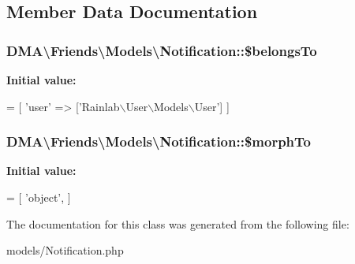 

\subsection{Member Data Documentation}
\hypertarget{classDMA_1_1Friends_1_1Models_1_1Notification_a7bd3ea8c8431f36da353372d8e42ae44}{
\subsubsection[{\$belongs\+To}]{\setlength{\rightskip}{0pt plus 5cm}D\+M\+A\textbackslash{}\+Friends\textbackslash{}\+Models\textbackslash{}\+Notification\+::\$belongs\+To}}\label{classDMA_1_1Friends_1_1Models_1_1Notification_a7bd3ea8c8431f36da353372d8e42ae44}
{\bfseries Initial value\+:}
\begin{DoxyCode}
= [
        \textcolor{stringliteral}{'user'} => [\textcolor{stringliteral}{'Rainlab\(\backslash\)User\(\backslash\)Models\(\backslash\)User'}]    
    ]
\end{DoxyCode}
\hypertarget{classDMA_1_1Friends_1_1Models_1_1Notification_ac726a50fd0378357be2f744f4c0bfb66}{
\subsubsection[{\$morph\+To}]{\setlength{\rightskip}{0pt plus 5cm}D\+M\+A\textbackslash{}\+Friends\textbackslash{}\+Models\textbackslash{}\+Notification\+::\$morph\+To}}\label{classDMA_1_1Friends_1_1Models_1_1Notification_ac726a50fd0378357be2f744f4c0bfb66}
{\bfseries Initial value\+:}
\begin{DoxyCode}
= [
        \textcolor{stringliteral}{'object'},
    ]
\end{DoxyCode}


The documentation for this class was generated from the following file\+:\begin{DoxyCompactItemize}
\item 
models/Notification.\+php\end{DoxyCompactItemize}
